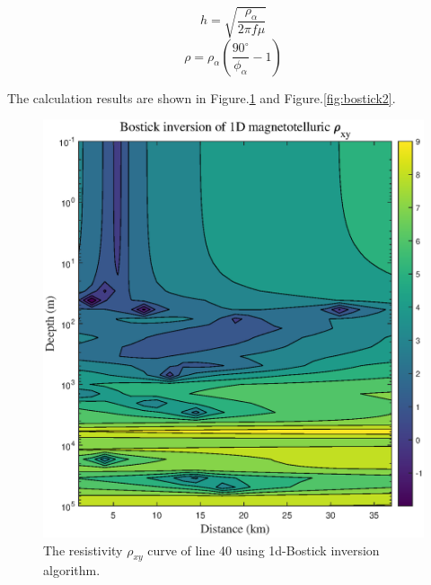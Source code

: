 \documentclass[9pt,a4paper,twoside]{rho-class/rho}
\begin{document}
\begin{equation}
    \label{Bostick1}
    h = \sqrt{\dfrac{\rho_\alpha}{2\pi f \mu}}
\end{equation}
\begin{equation}
    \label{Bostick2}
    \rho = \rho_\alpha\left(\dfrac{90^\circ}{\phi_\alpha}-1\right)
\end{equation}

The calculation results are shown in Figure.\ref{fig:bostick1} and Figure.\ref{fig:bostick2}.

\begin{figure}[H]
    \centering
    \includegraphics[width=0.95\columnwidth]{figures/Bostick1drxy.eps}
    \caption{The resistivity $\rho_{xy}$ curve of line 40 using 1d-Bostick inversion algorithm.}
    \label{fig:bostick1}
\end{figure}
\end{document}
